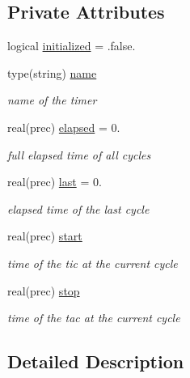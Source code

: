 \subsection*{Private Attributes}
\begin{DoxyCompactItemize}
\item 
logical \mbox{\hyperlink{structsimulationtimer__mod_1_1timer__class_a9252b5815eda23bfb60fda8d24265455}{initialized}} = .false.
\item 
type(string) \mbox{\hyperlink{structsimulationtimer__mod_1_1timer__class_aa9021f130f1ff4431ce394e38cea3ac1}{name}}
\begin{DoxyCompactList}\small\item\em name of the timer \end{DoxyCompactList}\item 
real(prec) \mbox{\hyperlink{structsimulationtimer__mod_1_1timer__class_a17d19848f82f69a33cecb52829992d06}{elapsed}} = 0.
\begin{DoxyCompactList}\small\item\em full elapsed time of all cycles \end{DoxyCompactList}\item 
real(prec) \mbox{\hyperlink{structsimulationtimer__mod_1_1timer__class_a6dadb87043528a52de8e2571400a84e5}{last}} = 0.
\begin{DoxyCompactList}\small\item\em elapsed time of the last cycle \end{DoxyCompactList}\item 
real(prec) \mbox{\hyperlink{structsimulationtimer__mod_1_1timer__class_ad61018be29f7e3ac5ecfa6b2d068e581}{start}}
\begin{DoxyCompactList}\small\item\em time of the tic at the current cycle \end{DoxyCompactList}\item 
real(prec) \mbox{\hyperlink{structsimulationtimer__mod_1_1timer__class_a96b9fcb1a8e2ae20422e274a025b290d}{stop}}
\begin{DoxyCompactList}\small\item\em time of the tac at the current cycle \end{DoxyCompactList}\end{DoxyCompactItemize}


\subsection{Detailed Description}


